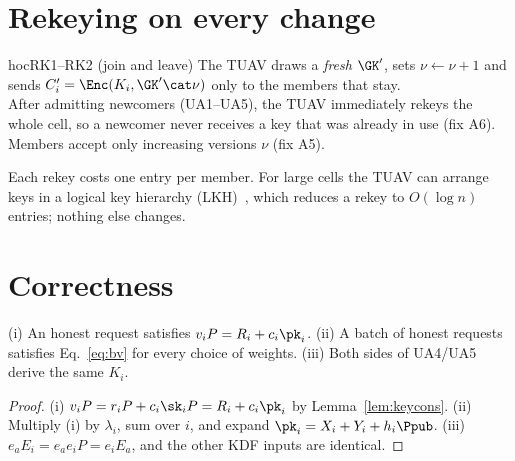\section{Rekeying on every change}
\begin{stepbox}{hoc}{RK1--RK2 \;(join and leave)}
 The TUAV draws a \emph{fresh} $\GK'$, sets $\nu\leftarrow\nu+1$ and sends $C_i'=\Enc(K_i,\GK'\cat\nu)$ only to
the members that stay.\\
 After admitting newcomers (UA1--UA5), the TUAV immediately rekeys the whole cell, so a newcomer never receives a key that was
already in use (fix A6). Members accept only increasing versions $\nu$ (fix A5).
\end{stepbox}
\begin{remark}
Each rekey costs one entry per member. For large cells the TUAV can arrange keys in a logical key hierarchy (LKH)~\cite{wgl98}, which reduces a rekey to
$O(\log n)$ entries; nothing else changes.
\end{remark}

\section{Correctness}
\begin{lemma}\label{lem:c1corr}
(i) An honest request satisfies $v_iP=R_i+c_i\pk_i$. (ii) A batch of honest requests satisfies Eq.~\eqref{eq:bv} for every choice of weights.
(iii) Both sides of UA4/UA5 derive the same $K_i$.
\end{lemma}
\begin{proof}
(i) $v_iP=r_iP+c_i\sk_iP=R_i+c_i\pk_i$ by Lemma~\ref{lem:keycons}. (ii) Multiply (i) by $\lambda_i$, sum over $i$, and expand
$\pk_i=X_i+Y_i+h_i\Ppub$. (iii) $e_aE_i=e_ae_iP=e_iE_a$, and the other KDF inputs are identical.
\end{proof}


